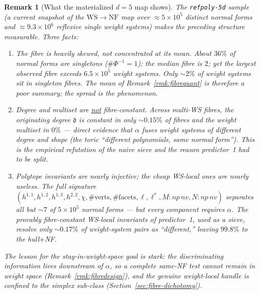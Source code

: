\documentclass{amsart}
\newtheorem{remark}[theorem]{Remark}
\begin{document}
\begin{remark}[What the materialized $d=5$ map shows]\label{rmk:fibredata}
The \texttt{refpoly-5d} sample (a current snapshot of the
$\mathrm{WS}\to\mathrm{NF}$ map over $\approx 5\times 10^{5}$ distinct normal
forms and $\approx 9.3\times 10^{6}$ reflexive single weight systems) makes the
preceding structure measurable. Three facts:
\begin{enumerate}
  \item[\textnormal{(i)}] \emph{The fibre is heavily skewed, not concentrated at
        its mean.} About $36\%$ of normal forms are \emph{singletons}
        ($\#\Phi^{-1}=1$); the median fibre is $2$; yet the largest observed
        fibre exceeds $6.5\times 10^{5}$ weight systems. Only $\sim$$2\%$ of
        weight systems sit in singleton fibres. The mean of
        Remark~\ref{rmk:fibrequant} is therefore a poor summary; \emph{the
        spread is the phenomenon.}
  \item[\textnormal{(ii)}] \emph{Degree and multiset are \underline{not}
        fibre-constant.} Across multi-WS fibres, the originating degree
        $\mathfrak d$ is constant in only $\sim$$0.15\%$ of fibres and the
        weight multiset in $0\%$ --- direct evidence that $\alpha$ fuses
        weight systems of different degree and shape (the toric ``different
        polynomials, same normal form''). This is the empirical refutation of
        the naive sieve and the reason predictor~1 had to be split.
  \item[\textnormal{(iii)}] \emph{Polytope invariants are nearly injective; the
        cheap WS-local ones are nearly useless.} The full signature
        $(h^{1,1},h^{1,2},h^{1,3},h^{2,2},\chi,\#\text{verts},\#\text{facets},
        \ell,\ell^{*},M{:}np\,nv,N{:}np\,nv)$ separates all but $\sim$$7$ of
        $5\times 10^{5}$ normal forms --- but every component requires $\alpha$.
        The provably fibre-constant \emph{WS-local} invariants of predictor~1,
        used as a sieve, resolve only $\sim$$0.17\%$ of weight-system pairs as
        ``different,'' leaving $99.8\%$ to the hull$+$NF.
\end{enumerate}
The lesson for the stay-in-weight-space goal is stark: \emph{the discriminating
information lives downstream of $\alpha$}, so a complete same-NF test cannot
remain in weight space (Remark~\ref{rmk:fibredesign}), and the genuine
weight-local handle is confined to the simplex sub-class
(Section~\ref{sec:fibre-dichotomy}).
\end{remark}
\end{document}
